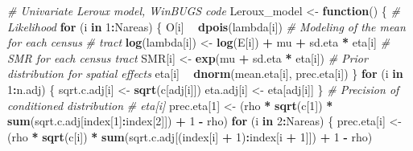 \documentclass[]{article}
\newenvironment{Shaded}{\begin{snugshade}}{\end{snugshade}}
\newcommand{\KeywordTok}[1]{\textcolor[rgb]{0.13,0.29,0.53}{\textbf{#1}}}
\newcommand{\DecValTok}[1]{\textcolor[rgb]{0.00,0.00,0.81}{#1}}
\newcommand{\StringTok}[1]{\textcolor[rgb]{0.31,0.60,0.02}{#1}}
\newcommand{\CommentTok}[1]{\textcolor[rgb]{0.56,0.35,0.01}{\textit{#1}}}
\newcommand{\ControlFlowTok}[1]{\textcolor[rgb]{0.13,0.29,0.53}{\textbf{#1}}}
\newcommand{\OperatorTok}[1]{\textcolor[rgb]{0.81,0.36,0.00}{\textbf{#1}}}
\newcommand{\NormalTok}[1]{#1}
\begin{document}
\begin{Shaded}
\begin{Highlighting}[]
\CommentTok{# Univariate Leroux model, WinBUGS code}
\NormalTok{Leroux_model <-}\StringTok{ }\ControlFlowTok{function}\NormalTok{() \{}
    \CommentTok{# Likelihood}
    \ControlFlowTok{for}\NormalTok{ (i }\ControlFlowTok{in} \DecValTok{1}\OperatorTok{:}\NormalTok{Nareas) \{}
\NormalTok{        O[i] }\OperatorTok{~}\StringTok{ }\KeywordTok{dpois}\NormalTok{(lambda[i])}
        \CommentTok{# Modeling of the mean for each census}
        \CommentTok{# tract}
        \KeywordTok{log}\NormalTok{(lambda[i]) <-}\StringTok{ }\KeywordTok{log}\NormalTok{(E[i]) }\OperatorTok{+}\StringTok{ }\NormalTok{mu }\OperatorTok{+}\StringTok{ }
\StringTok{            }\NormalTok{sd.eta }\OperatorTok{*}\StringTok{ }\NormalTok{eta[i]}
        \CommentTok{# SMR for each census tract}
\NormalTok{        SMR[i] <-}\StringTok{ }\KeywordTok{exp}\NormalTok{(mu }\OperatorTok{+}\StringTok{ }\NormalTok{sd.eta }\OperatorTok{*}\StringTok{ }\NormalTok{eta[i])}
        \CommentTok{# Prior distribution for spatial effects}
\NormalTok{        eta[i] }\OperatorTok{~}\StringTok{ }\KeywordTok{dnorm}\NormalTok{(mean.eta[i], prec.eta[i])}
\NormalTok{    \}}
    \ControlFlowTok{for}\NormalTok{ (i }\ControlFlowTok{in} \DecValTok{1}\OperatorTok{:}\NormalTok{n.adj) \{}
\NormalTok{        sqrt.c.adj[i] <-}\StringTok{ }\KeywordTok{sqrt}\NormalTok{(c[adj[i]])}
\NormalTok{        eta.adj[i] <-}\StringTok{ }\NormalTok{eta[adj[i]]}
\NormalTok{    \}}
    \CommentTok{# Precision of conditioned distribution}
    \CommentTok{# eta[i]}
\NormalTok{    prec.eta[}\DecValTok{1}\NormalTok{] <-}\StringTok{ }\NormalTok{(rho }\OperatorTok{*}\StringTok{ }\KeywordTok{sqrt}\NormalTok{(c[}\DecValTok{1}\NormalTok{]) }\OperatorTok{*}\StringTok{ }\KeywordTok{sum}\NormalTok{(sqrt.c.adj[index[}\DecValTok{1}\NormalTok{]}\OperatorTok{:}\NormalTok{index[}\DecValTok{2}\NormalTok{]]) }\OperatorTok{+}\StringTok{ }
\StringTok{        }\DecValTok{1} \OperatorTok{-}\StringTok{ }\NormalTok{rho)}
    \ControlFlowTok{for}\NormalTok{ (i }\ControlFlowTok{in} \DecValTok{2}\OperatorTok{:}\NormalTok{Nareas) \{}
\NormalTok{        prec.eta[i] <-}\StringTok{ }\NormalTok{(rho }\OperatorTok{*}\StringTok{ }\KeywordTok{sqrt}\NormalTok{(c[i]) }\OperatorTok{*}\StringTok{ }
\StringTok{            }\KeywordTok{sum}\NormalTok{(sqrt.c.adj[(index[i] }\OperatorTok{+}\StringTok{ }\DecValTok{1}\NormalTok{)}\OperatorTok{:}\NormalTok{index[i }\OperatorTok{+}\StringTok{ }
\StringTok{                }\DecValTok{1}\NormalTok{]]) }\OperatorTok{+}\StringTok{ }\DecValTok{1} \OperatorTok{-}\StringTok{ }\NormalTok{rho)}

\end{Highlighting}
\end{Shaded}
\end{document}
